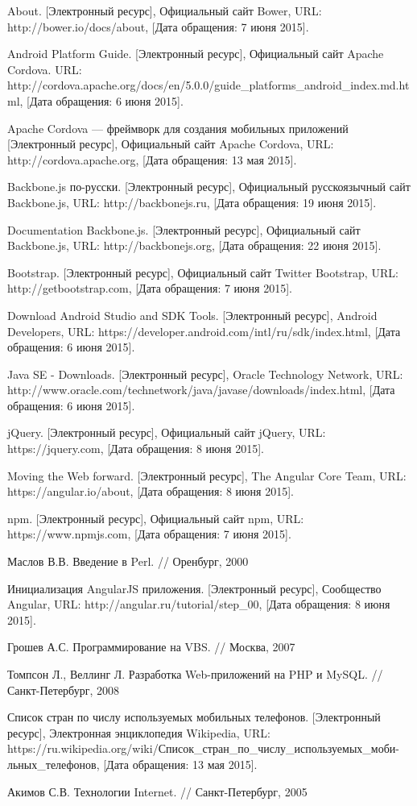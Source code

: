 \begin{thebibliography}{1}
 About. [Электронный ресурс], Официальный сайт Bower, URL: http://bower.io/docs/about, [Дата обращения: 7 июня 2015].

 Android Platform Guide. [Электронный ресурс],  Официальный сайт Apache Cordova. URL: http://cordova.apache.org/docs/en/5.0.0/guide\_platforms\_android\_index.md.html, [Дата обращения: 6 июня 2015].

 Apache Cordova --- фреймворк для создания мобильных приложений [Электронный ресурс], Официальный сайт Apache Cordova, URL: http://cordova.apache.org, [Дата обращения: 13 мая 2015].

 Backbone.js по-русски. [Электронный ресурс], Официальный русскоязычный сайт Backbone.js, URL: http://backbonejs.ru, [Дата обращения: 19 июня 2015].

 Documentation Backbone.js. [Электронный ресурс], Официальный сайт Backbone.js, URL: http://backbonejs.org, [Дата обращения: 22 июня 2015].

 Bootstrap. [Электронный ресурс], Официальный сайт  Twitter Bootstrap, URL: http://getbootstrap.com, [Дата обращения: 7 июня 2015].

 Download Android Studio and SDK Tools. [Электронный ресурс], Android Developers, URL: https://developer.android.com/intl/ru/sdk/index.html, [Дата обращения: 6 июня 2015].

 Java SE - Downloads. [Электронный ресурс], Oracle Technology Network, URL: http://www.oracle.com/technetwork/java/javase/downloads/index.html, [Дата обращения: 6 июня 2015].

 jQuery. [Электронный ресурс], Официальный сайт jQuery, URL: https://jquery.com, [Дата обращения: 8 июня 2015].

 Moving the Web forward. [Электронный ресурс], The Angular Core Team, URL: https://angular.io/about, [Дата обращения: 8 июня 2015].

 npm. [Электронный ресурс], Официальный сайт npm, URL: https://www.npmjs.com, [Дата обращения: 7 июня 2015].

 Маслов В.В. Введение в Perl. // Оренбург, 2000

 Инициализация AngularJS приложения. [Электронный ресурс], Сообщество Angular, URL: http://angular.ru/tutorial/step\_00, [Дата обращения: 8 июня 2015].

 Грошев А.С. Программирование на VBS. // Москва, 2007

 Томпсон Л., Веллинг Л. Разработка Web-приложений на PHP и MySQL. // Санкт-Петербург, 2008

 Список стран по числу используемых мобильных телефонов. [Электронный ресурс], Электронная энциклопедия Wikipedia, URL: https://ru.wikipedia.org/wiki/Список\_стран\_по\_числу\_используемых\_моби- льных\_телефонов, [Дата обращения: 13 мая 2015].

 Акимов С.В. Технологии Internet. // Санкт-Петербург, 2005
\end{thebibliography}
